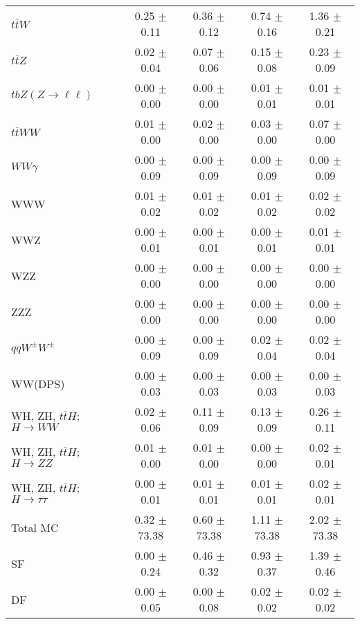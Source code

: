 \begin{tabular}{l|cccc}
                   $t\overline{t}W$ &  0.25 $\pm$  0.11 &  0.36 $\pm$  0.12 &  0.74 $\pm$  0.16 &  1.36 $\pm$  0.21 \\
                   $t\overline{t}Z$ &  0.02 $\pm$  0.04 &  0.07 $\pm$  0.06 &  0.15 $\pm$  0.08 &  0.23 $\pm$  0.09 \\
    $tbZ (Z \rightarrow \ell \ell)$ &  0.00 $\pm$  0.00 &  0.00 $\pm$  0.00 &  0.01 $\pm$  0.01 &  0.01 $\pm$  0.01 \\
                  $t\overline{t}WW$ &  0.01 $\pm$  0.00 &  0.02 $\pm$  0.00 &  0.03 $\pm$  0.00 &  0.07 $\pm$  0.00 \\
                         $WW\gamma$ &  0.00 $\pm$  0.09 &  0.00 $\pm$  0.09 &  0.00 $\pm$  0.09 &  0.00 $\pm$  0.09 \\
                                WWW &  0.01 $\pm$  0.02 &  0.01 $\pm$  0.02 &  0.01 $\pm$  0.02 &  0.02 $\pm$  0.02 \\
                                WWZ &  0.00 $\pm$  0.01 &  0.00 $\pm$  0.01 &  0.00 $\pm$  0.01 &  0.01 $\pm$  0.01 \\
                                WZZ &  0.00 $\pm$  0.00 &  0.00 $\pm$  0.00 &  0.00 $\pm$  0.00 &  0.00 $\pm$  0.00 \\
                                ZZZ &  0.00 $\pm$  0.00 &  0.00 $\pm$  0.00 &  0.00 $\pm$  0.00 &  0.00 $\pm$  0.00 \\
                 $qqW^{\pm}W^{\pm}$ &  0.00 $\pm$  0.09 &  0.00 $\pm$  0.09 &  0.02 $\pm$  0.04 &  0.02 $\pm$  0.04 \\
                            WW(DPS) &  0.00 $\pm$  0.03 &  0.00 $\pm$  0.03 &  0.00 $\pm$  0.03 &  0.00 $\pm$  0.03 \\
WH, ZH, $t\bar{t}H$; $H \rightarrow WW$ &  0.02 $\pm$  0.06 &  0.11 $\pm$  0.09 &  0.13 $\pm$  0.09 &  0.26 $\pm$  0.11 \\
WH, ZH, $t\bar{t}H$; $H \rightarrow ZZ$ &  0.01 $\pm$  0.00 &  0.01 $\pm$  0.00 &  0.00 $\pm$  0.00 &  0.02 $\pm$  0.01 \\
WH, ZH, $t\bar{t}H$; $H \rightarrow \tau\tau$ &  0.00 $\pm$  0.01 &  0.01 $\pm$  0.01 &  0.01 $\pm$  0.01 &  0.02 $\pm$  0.01 \\
\hline\hline
                           Total MC &  0.32 $\pm$ 73.38 &  0.60 $\pm$ 73.38 &  1.11 $\pm$ 73.38 &  2.02 $\pm$ 73.38 \\
\hline
                                 SF &  0.00 $\pm$  0.24 &  0.46 $\pm$  0.32 &  0.93 $\pm$  0.37 &  1.39 $\pm$  0.46 \\
                                 DF &  0.00 $\pm$  0.05 &  0.00 $\pm$  0.08 &  0.02 $\pm$  0.02 &  0.02 $\pm$  0.02 \\

\end{tabular}
